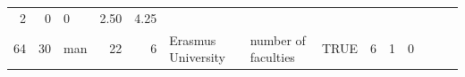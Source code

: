 \documentclass[]{svmono}
\theoremstyle{definition}
\theoremstyle{definition}
\theoremstyle{definition}
\theoremstyle{remark}
\begin{document}
\begin{longtable}[]{@{}rrlrrlllrrrrrr@{}}
\begin{minipage}[t]{0.03\columnwidth}
2\strut
\end{minipage} & \begin{minipage}[t]{0.05\columnwidth}\raggedleft\strut
0\strut
\end{minipage} & \begin{minipage}[t]{0.06\columnwidth}\raggedleft\strut
0\strut
\end{minipage} & \begin{minipage}[t]{0.04\columnwidth}\raggedleft\strut
2.50\strut
\end{minipage} & \begin{minipage}[t]{0.03\columnwidth}\raggedleft\strut
4.25\strut
\end{minipage}\tabularnewline
\begin{minipage}[t]{0.02\columnwidth}\raggedleft\strut
64\strut
\end{minipage} & \begin{minipage}[t]{0.03\columnwidth}\raggedleft\strut
30\strut
\end{minipage} & \begin{minipage}[t]{0.03\columnwidth}\raggedright\strut
man\strut
\end{minipage} & \begin{minipage}[t]{0.02\columnwidth}\raggedleft\strut
22\strut
\end{minipage} & \begin{minipage}[t]{0.03\columnwidth}\raggedleft\strut
6\strut
\end{minipage} & \begin{minipage}[t]{0.09\columnwidth}\raggedright\strut
Erasmus University\strut
\end{minipage} & \begin{minipage}[t]{0.14\columnwidth}\raggedright\strut
number of faculties\strut
\end{minipage} & \begin{minipage}[t]{0.04\columnwidth}\raggedright\strut
TRUE\strut
\end{minipage} & \begin{minipage}[t]{0.02\columnwidth}\raggedleft\strut
6\strut
\end{minipage} & \begin{minipage}[t]{0.03\columnwidth}\raggedleft\strut
1\strut
\end{minipage} & \begin{minipage}[t]{0.05\columnwidth}\raggedleft\strut
0\strut
\end{minipage} & \begin{minipage}[t]{0.06\columnwidth}\raggedleft\strut

\end{minipage}
\end{longtable}
\end{document}
